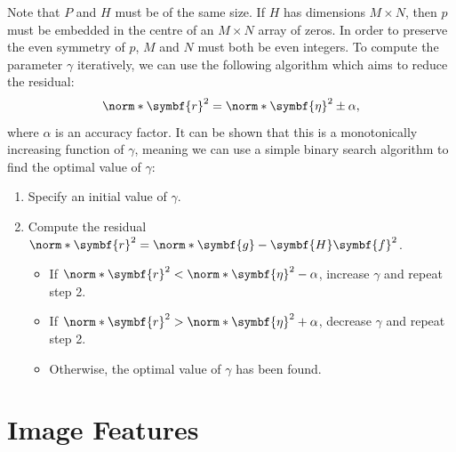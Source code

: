 \documentclass{article}
\begin{document}
Note that \(P\) and \(H\) must be of the same size. If \(H\) has
dimensions \(M \times N\), then \(p\) must be embedded in the centre of
an \(M \times N\) array of zeros. In order to preserve the even symmetry
of \(p\), \(M\) and \(N\) must both be even integers. To compute the
parameter \(\gamma\) iteratively, we can use the following algorithm
which aims to reduce the residual:
\begin{equation*}
    \norm*{\symbf{r}}^2 = \norm*{\symbf{\eta}}^2 \pm \alpha,
\end{equation*}
where \(\alpha\) is an accuracy factor. It can be shown that this is a
monotonically increasing function of \(\gamma\), meaning we can use a
simple binary search algorithm to find the optimal value of \(\gamma\):
\begin{enumerate}
    \item Specify an initial value of \(\gamma\).
    \item Compute the residual \(\norm*{\symbf{r}}^2 = \norm*{\symbf{g}
          - \symbf{H} \symbf{f}}^2\).
          \begin{itemize}
              \item If \(\norm*{\symbf{r}}^2 < \norm*{\symbf{\eta}}^2 -
                    \alpha\), increase \(\gamma\) and repeat step 2.
              \item If \(\norm*{\symbf{r}}^2 > \norm*{\symbf{\eta}}^2 +
                    \alpha\), decrease \(\gamma\) and repeat step 2.
              \item Otherwise, the optimal value of \(\gamma\) has been
                    found.
          \end{itemize}
\end{enumerate}
\section{Image Features}
\end{document}
